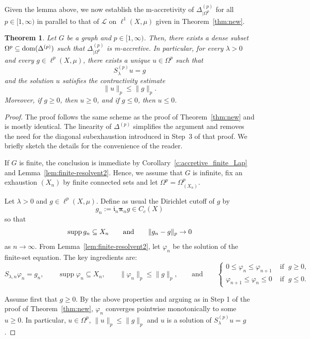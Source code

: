 \documentclass[letterpaper]{article}
\newtheorem{theorem}[lemma]{Theorem}
\theoremstyle{definition}
\theoremstyle{named}
\numberwithin{equation}{section}
\newcommand{\dom}{\textnormal{dom}} %
\newcommand{\Deltaphi}{\mathcal{L}}
\begin{document}
Given the lemma above,
we now establish the m-accretivity of $\Delta^{(p)}_{|\Omega^p}$ for all $p \in [1,\infty)$
in parallel to that of $\Deltaphi$ on $\ell^1(X,\mu)$ given in Theorem~\ref{thm:new}.
\begin{theorem}\label{thm:new2}
Let $G$ be a  graph and  $p\in [1, \infty)$. Then, there exists a dense subset $\Omega^p\subseteq\dom(\Delta^{(p)})$ such that $\Delta^{(p)}_{|\Omega^p}$ is m-accretive. In particular, for every $\lambda>0$ and every $g\in \ell^{p}(X,\mu)$, there exists a unique $u\in \Omega^p$ such that
\[
S^{(p)}_\lambda u=g
\]
and the solution $u$ satisfies the contractivity estimate
\[
\|u\|_p\leq \|g\|_p.
\]
Moreover, if $g\geq 0$, then $u\geq 0$, and if $g\leq 0$, then $u\leq 0$.
\end{theorem}
\begin{proof}
The proof follows the same scheme as the proof of Theorem~\ref{thm:new} and is mostly identical. The linearity of $\Delta^{(p)}$ simplifies the argument and removes the need for the diagonal 
subexhaustion introduced in Step~3 of that proof. We briefly sketch the details for the convenience of the reader.

If $G$ is finite, the conclusion is immediate by Corollary~\ref{c:accretive_finite_Lap} and Lemma~\ref{lem:finite-resolvent2}. Hence, we assume that $G$ is infinite, fix an exhaustion $(X_n)$ by finite connected sets and let $\Omega^p=\Omega^p_{(X_n)}$.

Let $\lambda>0$ and $g\in\ell^p(X,\mu)$. Define as usual the Dirichlet cutoff of $g$ by
\[
g_n:=\boldsymbol{\mathfrak{i}}_n\boldsymbol{\pi}_n g\in C_c(X)
\]
so that
$$\operatorname{supp} g_n\subseteq X_n \qquad \textup{and} \qquad \|g_n - g\|_p \to 0$$
as $n \to \infty$.
From Lemma~\ref{lem:finite-resolvent2}, let $\varphi_n$ be the solution of the finite-set equation. The key ingredients are: 
\begin{equation}\label{eq:linear_1}
S_{\lambda,n}\varphi_n=g_n,\qquad
\operatorname{supp}\varphi_n\subseteq X_n, \qquad \|\varphi_n\|_p\leq  \|g\|_p, \qquad \mbox{and} \qquad  \begin{cases}
    0\leq \varphi_n\leq \varphi_{n+1} & \mbox{ if } \; g\geq 0,\\
    \varphi_{n+1} \leq \varphi_n\leq 0  & \mbox{ if } \; g\leq 0.
\end{cases}
\end{equation}

Assume first that $g\geq 0$. By the above properties and arguing as in Step 1 of the
proof of Theorem~\ref{thm:new},  $\varphi_n$ converges pointwise monotonically to some $u\geq 0$. In particular, $u\in \Omega^p$, $\|u\|_p \leq \|g\|_p$ and $u$ is a solution of $S^{(p)}_\lambda u=g$.



\end{proof}
\end{document}
